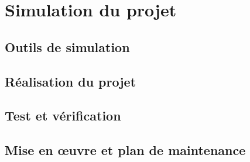 \chapter{Simulation du projet}
\section{Outils de simulation}

\section{Réalisation du projet}

\section{Test et vérification}

\section{Mise en œuvre et plan de maintenance}